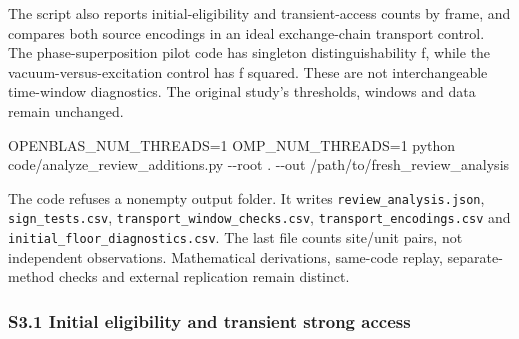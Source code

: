 \documentclass[
  10pt,
  a4paper,
]{article}
\newenvironment{Shaded}{}{}
\newcommand{\NormalTok}[1]{#1}
\begin{document}
The script also reports initial-eligibility and transient-access counts
by frame, and compares both source encodings in an ideal exchange-chain
transport control. The phase-superposition pilot code has singleton
distinguishability \textbar f\textbar, while the
vacuum-versus-excitation control has \textbar f\textbar{} squared. These
are not interchangeable time-window diagnostics. The original study's
thresholds, windows and data remain unchanged.

\begin{Shaded}
\begin{Highlighting}[]
\NormalTok{OPENBLAS\_NUM\_THREADS=1 OMP\_NUM\_THREADS=1 python code/analyze\_review\_additions.py {-}{-}root . {-}{-}out /path/to/fresh\_review\_analysis}
\end{Highlighting}
\end{Shaded}

The code refuses a nonempty output folder. It writes
\nolinkurl{review_analysis.json}, \nolinkurl{sign_tests.csv},
\nolinkurl{transport_window_checks.csv},
\nolinkurl{transport_encodings.csv} and
\nolinkurl{initial_floor_diagnostics.csv}. The last file counts
site/unit pairs, not independent observations. Mathematical derivations,
same-code replay, separate-method checks and external replication remain
distinct.

\subsubsection{S3.1 Initial eligibility and transient strong
access}\label{s3.1-initial-eligibility-and-transient-strong-access}
\end{document}
